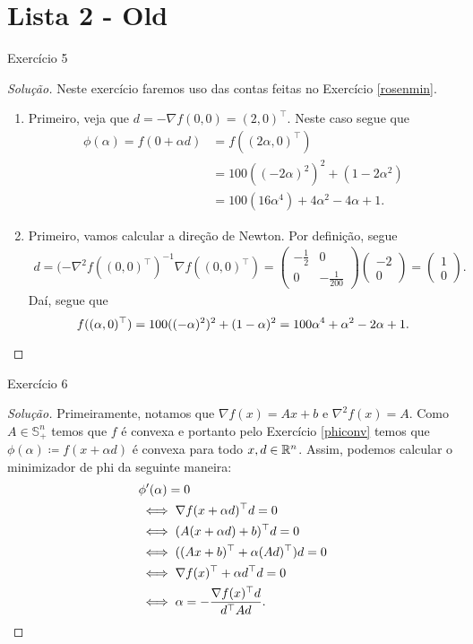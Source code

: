 \documentclass[12pt,twoside,a4paper]{article}
\begin{document}
\section{Lista 2 - Old}
\begin{problema}
Exercício 5  
\end{problema}
\begin{proof}[Solução]
  Neste exercício faremos uso das contas feitas no
  Exercício \ref{rosenmin}.
  \begin{enumerate}
  \item Primeiro, veja que \(d=-\nabla f(0,0)=(2,0)^\top\). Neste caso
    segue que
    \begin{align*}
      \phi(\alpha)=f(0+\alpha d)&=f((2\alpha,0)^\top)\\&=
      100((-2\alpha)^2)^2+(1-2\alpha^2)\\&=
      100(16\alpha^4)+4\alpha^2-4\alpha + 1.
    \end{align*}
  \item Primeiro, vamos calcular a direção de Newton. Por definição, segue
    \begin{align*}
      d= (-\nabla^2f((0,0)^\top)^{-1}\nabla f((0,0)^\top)=\begin{pmatrix}
        -\frac{1}{2} & 0 \\ 0 & -\frac{1}{200}\end{pmatrix}\begin{pmatrix}
        -2 \\ 0 
      \end{pmatrix}=\begin{pmatrix}1 \\ 0\end{pmatrix}.
    \end{align*}
    Daí, segue que
    \[f((\alpha,0)^\top)=100((-\alpha)^2)^2+(1-\alpha)^2= 100\alpha^4+\alpha^2-2\alpha+1.\qedhere\]
  \end{enumerate}
\end{proof}

\begin{problema}\label{alphabuscaex}
Exercício 6  
\end{problema}
\begin{proof}[Solução]
  Primeiramente, notamos que \(\nabla f(x)=Ax + b\) e \(\nabla^2 f(x)=A\).
  Como \(A\in\mathbb{S}^n_+\) temos que \(f\) é convexa e portanto pelo
  Exercício \ref{phiconv} temos que
  \(\phi(\alpha)\coloneqq f(x+ \alpha d)\) é convexa para todo
  \(x,d\in\mathbb{R}^n\). Assim, podemos calcular o minimizador de phi
  da seguinte maneira:
  \begin{align*}
    &\phi^\prime(\alpha)=0\\&
    \iff\nabla f(x+\alpha d)^\top d=0 \\&
    \iff (A(x+\alpha d) + b)^\top d=0 \\&
    \iff ((Ax+b)^\top +\alpha (Ad)^\top)d=0 \\&
    \iff \nabla f(x)^\top +\alpha d^\top d=0 \\&
    \iff \alpha=-\frac{\nabla f(x)^\top d}{d^\top A d}.\qedhere
   \end{align*}
 \end{proof}
\end{document}
